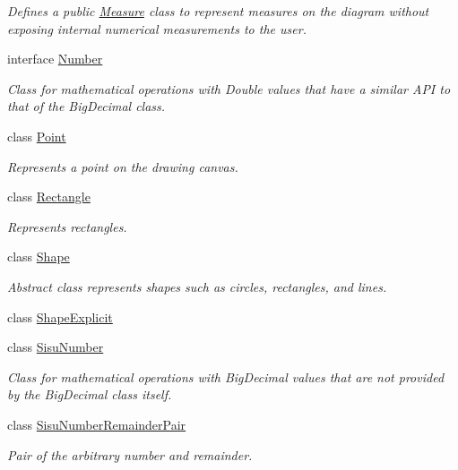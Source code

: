\begin{DoxyCompactItemize}
\begin{DoxyCompactList}\small\item\em Defines a public \hyperlink{classcom_1_1aarrelaakso_1_1drawl_1_1_measure}{Measure} class to represent measures on the diagram without exposing internal numerical measurements to the user. \end{DoxyCompactList}\item 
interface \hyperlink{interfacecom_1_1aarrelaakso_1_1drawl_1_1_number}{Number}
\begin{DoxyCompactList}\small\item\em Class for mathematical operations with Double values that have a similar A\+PI to that of the Big\+Decimal class. \end{DoxyCompactList}\item 
class \hyperlink{classcom_1_1aarrelaakso_1_1drawl_1_1_point}{Point}
\begin{DoxyCompactList}\small\item\em Represents a point on the drawing canvas. \end{DoxyCompactList}\item 
class \hyperlink{classcom_1_1aarrelaakso_1_1drawl_1_1_rectangle}{Rectangle}
\begin{DoxyCompactList}\small\item\em Represents rectangles. \end{DoxyCompactList}\item 
class \hyperlink{classcom_1_1aarrelaakso_1_1drawl_1_1_shape}{Shape}
\begin{DoxyCompactList}\small\item\em Abstract class represents shapes such as circles, rectangles, and lines. \end{DoxyCompactList}\item 
class \hyperlink{classcom_1_1aarrelaakso_1_1drawl_1_1_shape_explicit}{Shape\+Explicit}
\item 
class \hyperlink{classcom_1_1aarrelaakso_1_1drawl_1_1_sisu_number}{Sisu\+Number}
\begin{DoxyCompactList}\small\item\em Class for mathematical operations with Big\+Decimal values that are not provided by the Big\+Decimal class itself. \end{DoxyCompactList}\item 
class \hyperlink{classcom_1_1aarrelaakso_1_1drawl_1_1_sisu_number_remainder_pair}{Sisu\+Number\+Remainder\+Pair}
\begin{DoxyCompactList}\small\item\em Pair of the arbitrary number and remainder. \end{DoxyCompactList}\item 

\end{DoxyCompactItemize}
